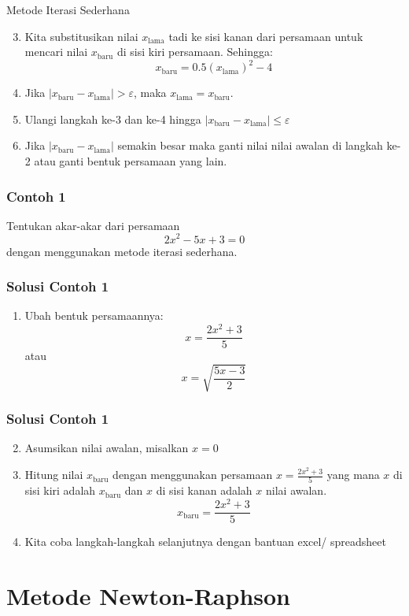\documentclass[pdflatex,compress,mathserif]{beamer}
\begin{document}
\begin{frame}{Metode Iterasi Sederhana}
	\begin{enumerate}
		\setcounter{enumi}{2}
		\item Kita substitusikan nilai $x_\text{lama}$ tadi ke sisi kanan dari persamaan untuk mencari nilai $x_\text{baru}$ di sisi kiri persamaan. Sehingga: $$ x_{\text{baru}} = 0.5(x_\text{lama})^2 - 4 $$
		\item Jika $|x_\text{baru} - x_\text{lama}| > \varepsilon $, maka $x_\text{lama} = x_\text{baru}$.
		\item Ulangi langkah ke-3 dan ke-4 hingga $|x_\text{baru} - x_\text{lama}| \leq \varepsilon $
		\item Jika $|x_\text{baru} - x_\text{lama}|$ semakin besar maka ganti nilai nilai awalan di langkah ke-2 atau ganti bentuk persamaan yang lain.
	\end{enumerate}
\end{frame}

\begin{frame}
	\frametitle{Contoh 1}
	Tentukan akar-akar dari persamaan $$ 2x^2 - 5x + 3 = 0 $$ dengan menggunakan metode iterasi sederhana.
\end{frame}

\begin{frame}
	\frametitle{Solusi Contoh 1}
	\begin{enumerate}
		\item Ubah bentuk persamaannya: $$ x = \frac{2x^2+3}{5} $$ atau $$ x = \sqrt{\frac{5x-3}{2}} $$
	\end{enumerate}
\end{frame}

\begin{frame}
	\frametitle{Solusi Contoh 1}
	\begin{enumerate}\setcounter{enumi}{1}
		\item Asumsikan nilai awalan, misalkan $x = 0$
		\item Hitung nilai $x_{\text{baru}}$ dengan menggunakan persamaan $ x = \frac{2x^2+3}{5} $ yang mana $x$ di sisi kiri adalah $x_{\text{baru}}$ dan $x$ di sisi kanan adalah $x$ nilai awalan. $$ x_{\text{baru}} = \frac{2x^2+3}{5} $$
		\item Kita coba langkah-langkah selanjutnya dengan bantuan excel/ spreadsheet
	\end{enumerate}
\end{frame}

\section{Metode Newton-Raphson}
\end{document}
